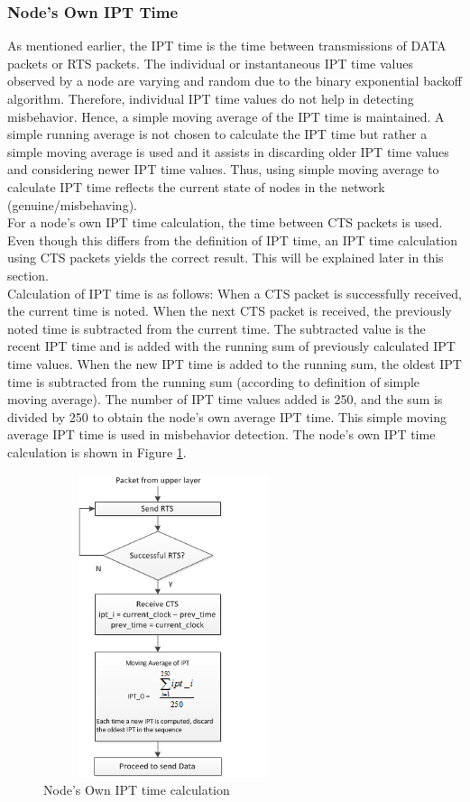 \documentclass[12pt,letterpaper,english]{article}
\begin{document}
\subsubsection{Node's Own IPT Time}
\indent As mentioned earlier, the IPT time is the time between transmissions of DATA packets or RTS packets. The individual or instantaneous IPT time values observed by a node are varying and random due to the binary exponential backoff algorithm. Therefore, individual IPT time values do not help in detecting misbehavior. Hence, a simple moving average of the IPT time is maintained. A simple running average is not chosen to calculate the IPT time but rather a simple moving average is used and it assists in discarding older IPT time values and considering newer IPT time values. Thus, using simple moving average to calculate IPT time reflects the current state of nodes in the network (genuine/misbehaving).
\\
\indent For a node's own IPT time calculation, the time between CTS packets is used. Even though this differs from the definition of IPT time, an IPT time calculation using CTS packets yields the correct result. This will be explained later in this section. 
\\
\indent Calculation of IPT time is as follows: When a CTS packet is successfully received, the current time is noted. When the next CTS packet is received, the previously noted time is subtracted from the current time. The subtracted value is the recent IPT time and is added with the running sum of previously calculated IPT time values. When the new IPT time is added to the running sum, the oldest IPT time is subtracted from the running sum (according to definition of simple moving average). The number of IPT time values added is 250, and the sum is divided by 250 to obtain the node's own average IPT time. This simple moving average IPT time is used in misbehavior detection. The node's own IPT time calculation is shown in Figure \ref{figure:ownipt}. 
\begin{figure}[H]
\centering
\includegraphics[width=3in,height=3.5in]{figures/ownipt.png}
\caption{Node's Own IPT time calculation}
\label{figure:ownipt}
\end{figure}
\end{document}
